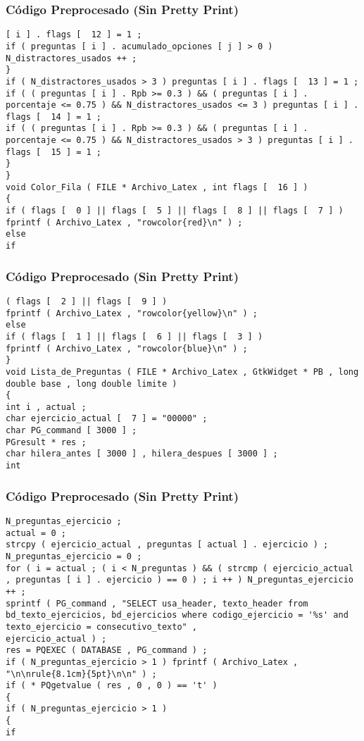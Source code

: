 \documentclass{beamer}
\begin{document}
\begin{frame}[fragile]
\frametitle{C\'odigo Preprocesado (Sin Pretty Print)}
\begin{lstlisting}[style=CStyle]
[ i ] . flags [  12 ] = 1 ; 
if ( preguntas [ i ] . acumulado_opciones [ j ] > 0 ) N_distractores_usados ++ ; 
} 
if ( N_distractores_usados > 3 ) preguntas [ i ] . flags [  13 ] = 1 ; 
if ( ( preguntas [ i ] . Rpb >= 0.3 ) && ( preguntas [ i ] . porcentaje <= 0.75 ) && N_distractores_usados <= 3 ) preguntas [ i ] . flags [  14 ] = 1 ; 
if ( ( preguntas [ i ] . Rpb >= 0.3 ) && ( preguntas [ i ] . porcentaje <= 0.75 ) && N_distractores_usados > 3 ) preguntas [ i ] . flags [  15 ] = 1 ; 
} 
} 
void Color_Fila ( FILE * Archivo_Latex , int flags [  16 ] ) 
{ 
if ( flags [  0 ] || flags [  5 ] || flags [  8 ] || flags [  7 ] ) 
fprintf ( Archivo_Latex , "rowcolor{red}\n" ) ; 
else 
if \end{lstlisting}
\end{frame}
\begin{frame}[fragile]
\frametitle{C\'odigo Preprocesado (Sin Pretty Print)}
\begin{lstlisting}[style=CStyle]
( flags [  2 ] || flags [  9 ] ) 
fprintf ( Archivo_Latex , "rowcolor{yellow}\n" ) ; 
else 
if ( flags [  1 ] || flags [  6 ] || flags [  3 ] ) 
fprintf ( Archivo_Latex , "rowcolor{blue}\n" ) ; 
} 
void Lista_de_Preguntas ( FILE * Archivo_Latex , GtkWidget * PB , long double base , long double limite ) 
{ 
int i , actual ; 
char ejercicio_actual [  7 ] = "00000" ; 
char PG_command [ 3000 ] ; 
PGresult * res ; 
char hilera_antes [ 3000 ] , hilera_despues [ 3000 ] ; 
int \end{lstlisting}
\end{frame}
\begin{frame}[fragile]
\frametitle{C\'odigo Preprocesado (Sin Pretty Print)}
\begin{lstlisting}[style=CStyle]
N_preguntas_ejercicio ; 
actual = 0 ; 
strcpy ( ejercicio_actual , preguntas [ actual ] . ejercicio ) ; 
N_preguntas_ejercicio = 0 ; 
for ( i = actual ; ( i < N_preguntas ) && ( strcmp ( ejercicio_actual , preguntas [ i ] . ejercicio ) == 0 ) ; i ++ ) N_preguntas_ejercicio ++ ; 
sprintf ( PG_command , "SELECT usa_header, texto_header from bd_texto_ejercicios, bd_ejercicios where codigo_ejercicio = '%s' and texto_ejercicio = consecutivo_texto" , 
ejercicio_actual ) ; 
res = PQEXEC ( DATABASE , PG_command ) ; 
if ( N_preguntas_ejercicio > 1 ) fprintf ( Archivo_Latex , "\n\nrule{8.1cm}{5pt}\n\n" ) ; 
if ( * PQgetvalue ( res , 0 , 0 ) == 't' ) 
{ 
if ( N_preguntas_ejercicio > 1 ) 
{ 
if \end{lstlisting}
\end{frame}
\end{document}
